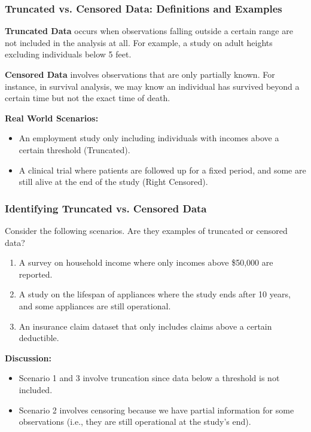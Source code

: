 \documentclass[compress,mathserif]{beamer}
\begin{document}
\begin{frame}
\frametitle{Truncated vs. Censored Data: Definitions and Examples}
\textbf{Truncated Data} occurs when observations falling outside a certain range are not included in the analysis at all. For example, a study on adult heights excluding individuals below 5 feet.

\textbf{Censored Data} involves observations that are only partially known. For instance, in survival analysis, we may know an individual has survived beyond a certain time but not the exact time of death.

\textbf{Real World Scenarios:}
\begin{itemize}
\item An employment study only including individuals with incomes above a certain threshold (Truncated).
\item A clinical trial where patients are followed up for a fixed period, and some are still alive at the end of the study (Right Censored).
\end{itemize}
\end{frame}


\begin{frame}
\frametitle{Identifying Truncated vs. Censored Data}
Consider the following scenarios. Are they examples of truncated or censored data?

\begin{enumerate}
\item A survey on household income where only incomes above \$50,000 are reported.
\item A study on the lifespan of appliances where the study ends after 10 years, and some appliances are still operational.
\item An insurance claim dataset that only includes claims above a certain deductible.
\end{enumerate}

\textbf{Discussion:}
\begin{itemize}
\item Scenario 1 and 3 involve truncation since data below a threshold is not included.
\item Scenario 2 involves censoring because we have partial information for some observations (i.e., they are still operational at the study's end).
\end{itemize}
\end{frame}
\end{document}
